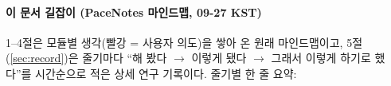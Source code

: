 \begin{abstract}
(아직 비움. 컨트리뷰션이 정해지면 쓴다. 마지막 갱신: 2026-09-24 01:18 UTC, 단계 2 모듈 설계(최종 일관성 점검 D11 반영).)
\end{abstract}

\paragraph{이 문서 길잡이 (PaceNotes 마인드맵, 09-27 KST)}
1--4절은 모듈별 생각(빨강 = 사용자 의도)을 쌓아 온 원래 마인드맵이고, 5절(\ref{sec:record})은 줄기마다 ``해 봤다 $\rightarrow$ 이렇게 됐다 $\rightarrow$ 그래서 이렇게 하기로 했다''를 시간순으로 적은 상세 연구 기록이다. 줄기별 한 줄 요약:

{\small\tableofcontents}
